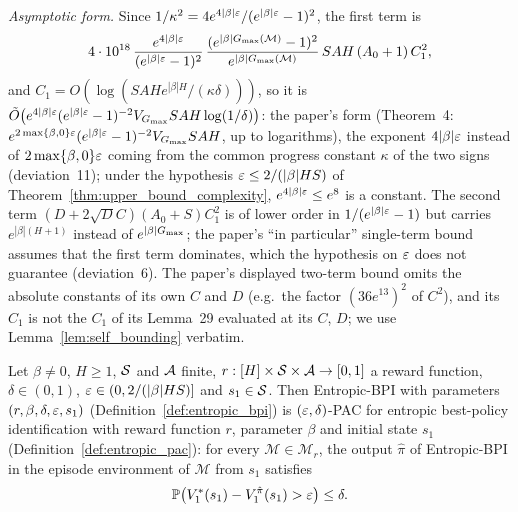\begin{remark}
\emph{Asymptotic form.} Since $1/\kappa^2 = 4e^{4|\beta|\varepsilon}/(e^{|\beta|\varepsilon}-1)^2$, the first
term is
\[
  4\cdot 10^{18}\,\frac{e^{4|\beta|\varepsilon}}{(e^{|\beta|\varepsilon} - 1)^2}\,
  \frac{(e^{|\beta|G_{\max}(\mathcal M)} - 1)^2}{e^{|\beta|G_{\max}(\mathcal M)}}\, SAH\,(A_0 + 1)\,C_1^2 ,
\]
and $C_1 = O(\log(SAH e^{|\beta| H}/(\kappa\delta)))$, so it is
$\tilde O\big(e^{4|\beta|\varepsilon}(e^{|\beta|\varepsilon}-1)^{-2} V_{G_{\max}} SAH\log(1/\delta)\big)$: the
paper's form (Theorem~4: $e^{2\max\{\beta,0\}\varepsilon}(e^{|\beta|\varepsilon}-1)^{-2}V_{G_{\max}}SAH$, up to
logarithms), the exponent $4|\beta|\varepsilon$ instead of $2\max\{\beta,0\}\varepsilon$ coming from the
common progress constant $\kappa$ of the two signs (deviation~11); under the hypothesis
$\varepsilon \le 2/(|\beta|HS)$ of Theorem~\ref{thm:upper_bound_complexity}, $e^{4|\beta|\varepsilon} \le e^8$
is a constant. The second term $(D + 2\sqrt D C)(A_0+S)C_1^2$ is of lower order in
$1/(e^{|\beta|\varepsilon}-1)$ but carries $e^{|\beta|(H+1)}$ instead of $e^{|\beta|G_{\max}}$; the
paper's ``in particular'' single-term bound assumes that the first term dominates, which the
hypothesis on $\varepsilon$ does not guarantee (deviation~6). The paper's displayed two-term bound
omits the absolute constants of its own $C$ and $D$ (e.g.\ the factor $(36e^{13})^2$ of $C^2$),
and its $C_1$ is not the $C_1$ of its Lemma~29 evaluated at its $C$, $D$; we use
Lemma~\ref{lem:self_bounding} verbatim.
\end{remark}

\begin{theorem}\label{thm:upper_bound_pac}
\leanok
{}
Let $\beta \ne 0$, $H \ge 1$, $\mathcal{S}$ and $\mathcal{A}$ finite, $r : [H]\times\mathcal{S}\times\mathcal{A} \to [0,1]$ a
reward function, $\delta \in (0,1)$, $\varepsilon \in (0, 2/(|\beta| H S)]$ and $s_1 \in \mathcal{S}$. Then
Entropic-BPI with parameters $(r, \beta, \delta, \varepsilon, s_1)$ (Definition~\ref{def:entropic_bpi})
is $(\varepsilon,\delta)$-PAC for entropic best-policy identification with reward function $r$,
parameter $\beta$ and initial state $s_1$ (Definition~\ref{def:entropic_pac}): for every
$\mathcal M \in \mathcal M_r$, the output $\hat\pi$ of Entropic-BPI in the episode environment
of $\mathcal M$ from $s_1$ satisfies
\[
  \mathbb{P}\big(V^*_1(s_1) - V^{\hat\pi}_1(s_1) > \varepsilon\big) \le \delta .
\]
\end{theorem}


